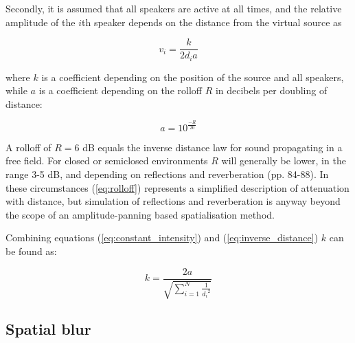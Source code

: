 \documentclass[twoside,10pt]{article}
\begin{document}
Secondly, it is assumed that all speakers are active at all times, and the relative amplitude of the $i$th speaker depends on the distance from the virtual source as 

\begin{equation} \label{eq:inverse_distance}
v_{i} = \frac{k}{2 d_{i} a} 
\end{equation}

where $k$ is a coefficient depending on the position of the source and all speakers, while $a$ is a coefficient depending on the rolloff $R$ in decibels per doubling of distance:

\begin{equation} \label{eq:rolloff}
	a = 10^{\frac{-R}{20}}
\end{equation}

A rolloff of $R = 6$ dB equals the inverse distance law for sound propagating in a free field. For closed or semiclosed environments $R$ will generally be lower, in the range 3-5 dB, and depending on reflections and reverberation \cite{Everest:2000handbook_acoustics} (pp. 84-88). In these circumstances (\ref{eq:rolloff}) represents a simplified description of attenuation with distance, but simulation of reflections and reverberation is anyway beyond the scope of an amplitude-panning based spatialisation method.


Combining equations (\ref{eq:constant_intensity}) and (\ref{eq:inverse_distance}) $k$ can be found as:

\begin{equation} \label{eq:calculate_k}
k = \frac{2a}{\sqrt{\sum_{i=1}^{N} \frac{1}{{d_{i}}^2}}}
\end{equation}




\subsection{Spatial blur}
\end{document}
